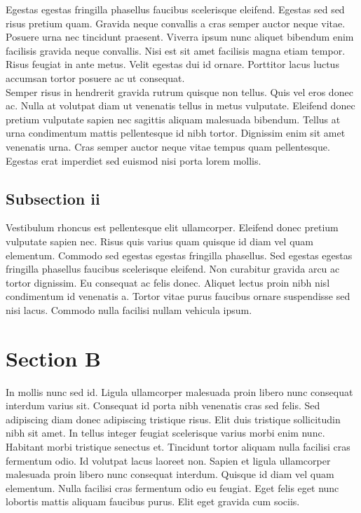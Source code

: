 \documentclass[letterpaper,12pt]{article}
\begin{document}
Egestas egestas fringilla phasellus faucibus scelerisque eleifend. Egestas sed sed risus pretium quam. Gravida neque convallis a cras semper auctor neque vitae. Posuere urna nec tincidunt praesent. Viverra ipsum nunc aliquet bibendum enim facilisis gravida neque convallis. Nisi est sit amet facilisis magna etiam tempor. Risus feugiat in ante metus. Velit egestas dui id ornare. Porttitor lacus luctus accumsan tortor posuere ac ut consequat.\\

Semper risus in hendrerit gravida rutrum quisque non tellus. Quis vel eros donec ac. Nulla at volutpat diam ut venenatis tellus in metus vulputate. Eleifend donec pretium vulputate sapien nec sagittis aliquam malesuada bibendum. Tellus at urna condimentum mattis pellentesque id nibh tortor. Dignissim enim sit amet venenatis urna. Cras semper auctor neque vitae tempus quam pellentesque. Egestas erat imperdiet sed euismod nisi porta lorem mollis.

\subsection{Subsection ii}

Vestibulum rhoncus est pellentesque elit ullamcorper. Eleifend donec pretium vulputate sapien nec. Risus quis varius quam quisque id diam vel quam elementum. Commodo sed egestas egestas fringilla phasellus. Sed egestas egestas fringilla phasellus faucibus scelerisque eleifend. Non curabitur gravida arcu ac tortor dignissim. Eu consequat ac felis donec. Aliquet lectus proin nibh nisl condimentum id venenatis a. Tortor vitae purus faucibus ornare suspendisse sed nisi lacus. Commodo nulla facilisi nullam vehicula ipsum.


\section{Section B}
\label{sec:section-B}

In mollis nunc sed id. Ligula ullamcorper malesuada proin libero nunc consequat interdum varius sit. Consequat id porta nibh venenatis cras sed felis. Sed adipiscing diam donec adipiscing tristique risus. Elit duis tristique sollicitudin nibh sit amet. In tellus integer feugiat scelerisque varius morbi enim nunc. Habitant morbi tristique senectus et. Tincidunt tortor aliquam nulla facilisi cras fermentum odio. Id volutpat lacus laoreet non. Sapien et ligula ullamcorper malesuada proin libero nunc consequat interdum. Quisque id diam vel quam elementum. Nulla facilisi cras fermentum odio eu feugiat. Eget felis eget nunc lobortis mattis aliquam faucibus purus. Elit eget gravida cum sociis.
\end{document}
